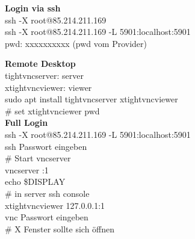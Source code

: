 \textbf{Login via ssh}\\
ssh -X root@85.214.211.169\\
ssh -X root@85.214.211.169 -L 5901:localhost:5901\\
pwd: xxxxxxxxxx (pwd vom Provider)

\textbf{Remote Desktop}\\
tightvncserver: server\\
xtightvncviewer: viewer\\
sudo apt install tightvncserver xtightvncviewer\\
\# set xtightvnciewer pwd\\

\textbf{Full Login}\\
ssh -X root@85.214.211.169 -L 5901:localhost:5901\\
ssh Passwort eingeben\\
\# Start vncserver\\
vncserver :1\\
echo \grqq{}\$DISPLAY\grqq{}\\
\# in server ssh console\\
xtightvncviewer 127.0.0.1:1\\
vnc Passwort eingeben\\
\# X Fenster sollte sich öffnen







